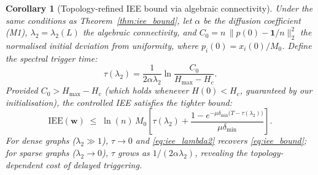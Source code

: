 \documentclass[review,12pt]{elsarticle}
\newcommand{\bfw}{\mathbf{w}}
\newcommand{\IEE}{\mathrm{IEE}}
\newcommand{\Hc}{H_c}
\newcommand{\Hmax}{H_{\max}}
\newcommand{\lambdat}{\lambda_2}
\newtheorem{corollary}{Corollary}
\begin{document}
\begin{corollary}[Topology-refined IEE bound via algebraic connectivity]
\label{cor:lambda2}
Under the same conditions as Theorem~\ref{thm:iee_bound}, let $\alpha$
be the diffusion coefficient (M1), $\lambdat = \lambda_2(L)$ the algebraic
connectivity, and $C_0 = n\,\|p(0) - \mathbf{1}/n\|_2^2$ the normalised
initial deviation from uniformity, where $p_i(0) = x_i(0)/M_0$.
Define the \emph{spectral trigger time}:
\begin{equation}
  \tau(\lambdat) = \frac{1}{2\alpha\lambdat}
    \ln\!\frac{C_0}{\Hmax - \Hc}.
  \label{eq:tau_lambda}
\end{equation}
Provided $C_0 > \Hmax - \Hc$ (which holds whenever $H(0) < \Hc$,
guaranteed by our initialisation), the controlled IEE satisfies the
tighter bound:
\begin{equation}
  \IEE(\bfw) \;\leq\; \ln(n)\,M_0\!\left[
    \tau(\lambdat) +
    \frac{1 - e^{-\mu\delta_{\min}\bigl(T - \tau(\lambdat)\bigr)}}{\mu\delta_{\min}}
  \right].
  \label{eq:iee_lambda2}
\end{equation}
For dense graphs ($\lambdat \gg 1$), $\tau \to 0$ and \eqref{eq:iee_lambda2}
recovers \eqref{eq:iee_bound}; for sparse graphs ($\lambdat \to 0$),
$\tau$ grows as $1/(2\alpha\lambdat)$, revealing the topology-dependent
cost of delayed triggering.
\end{corollary}
\end{document}
